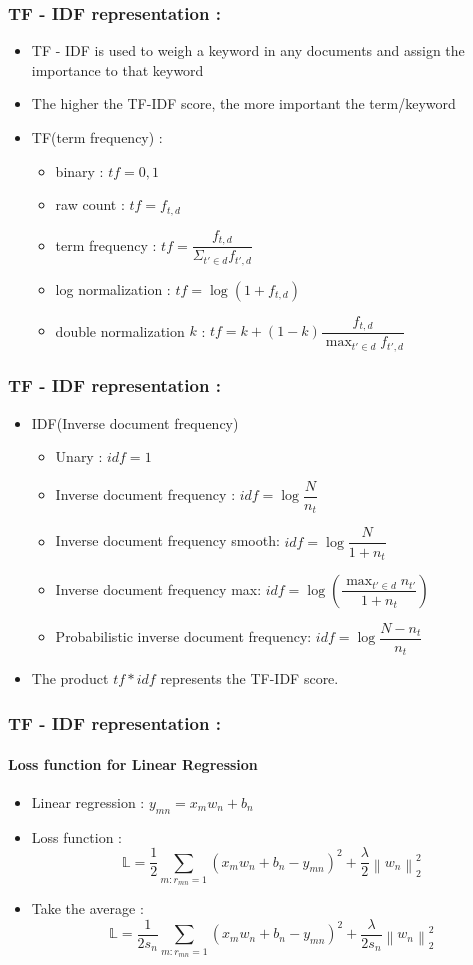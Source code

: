 \documentclass[11pt]{beamer}
\begin{document}
\begin{frame}
\frametitle{\textbf{TF - IDF representation : }}
	\begin{itemize}
	\pause\item TF - IDF is used to weigh a keyword in any documents and assign the importance to that keyword
	\item The higher the TF-IDF score, the more important the term/keyword
	\pause\item TF(term frequency) : 
	\begin{itemize}
		\item binary  : $tf = 0, 1 $
		\item raw count  : $tf = f_{t, d} $
		\item term frequency  : $tf = \dfrac{f_{t, d}}{\Sigma_{t'\in d}f_{t', d}} $
		\item log normalization  : $tf = \log(1 + f_{t, d})$
		\item double normalization $k$  : $tf = k + (1 - k) \dfrac{f_{t, d}}{\max_{t' \in d}f_{t',d}} $
	\end{itemize}
	\end{itemize}
\end{frame}

\begin{frame}
\frametitle{\textbf{TF - IDF representation : }}
\begin{itemize}
	\item IDF(Inverse document frequency)
	\begin{itemize}
		\pause\item Unary : $idf = 1$
		\item Inverse document frequency : $idf = \log \dfrac{N}{n_t}$
		\item Inverse document frequency smooth: $idf = \log\dfrac{N}{1+n_t}$
		\item Inverse document frequency max: $idf = \log\left(\dfrac{\max_{t'\in d}n_{t'}}{1 + n_t}\right)$
		\item Probabilistic inverse document frequency: $ idf = \log\dfrac{N-n_t}{n_t} $
	\end{itemize}
	\pause\item The product $tf * idf$ represents the TF-IDF score.
\end{itemize}
\end{frame}

\begin{frame}
\frametitle{\textbf{TF - IDF representation : }} 
\framesubtitle{\textbf{Loss function for Linear Regression}}
	\begin{itemize}
		\pause\item Linear regression : $ y_{mn} = x_mw_n + b_n $
		\pause\item Loss function : 
		$$ \mathbb{L} = \dfrac{1}{2}\sum_{m:r_{mn} = 1}\left(x_mw_n+b_n-y_{mn}\right)^2 + \dfrac{\lambda}{2}\left\|w_n\right\|_2^2  $$
		\pause\item Take the average : 
		$$ \mathbb{L} = \dfrac{1}{2s_n}\sum_{m:r_{mn} = 1}\left(x_mw_n+b_n-y_{mn}\right)^2 + \dfrac{\lambda}{2s_n}\left\|w_n\right\|_2^2  $$
	\end{itemize}
\end{frame}
\end{document}
